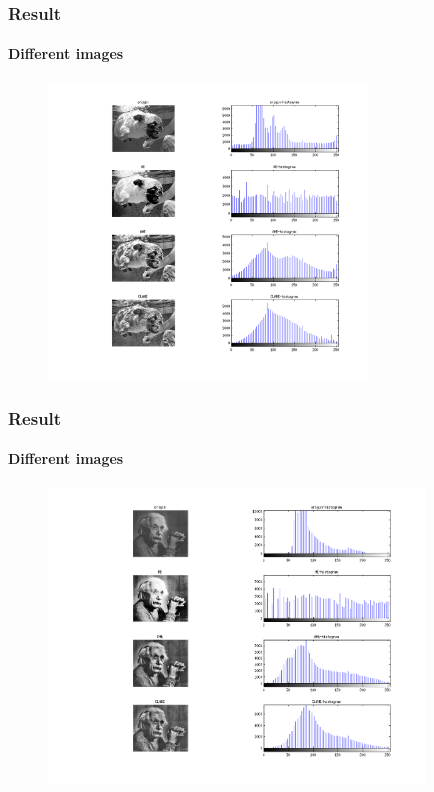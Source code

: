 \documentclass[11 pt,t]{beamer}
\begin{document}
\begin{frame}
\frametitle{Result}
\framesubtitle{Different images}
\begin{minipage}[t]{\linewidth}\centering
\begin{figure}
   \includegraphics[width=8.5cm]{dog.png}
\end{figure}
\end{minipage}
\end{frame}
\begin{frame}
\frametitle{Result}
\framesubtitle{Different images}
\begin{minipage}[t]{\linewidth}\centering
\begin{figure}
   \includegraphics[width=10cm]{einstein.png}
\end{figure}
\end{minipage}
\end{frame}
\end{document}
